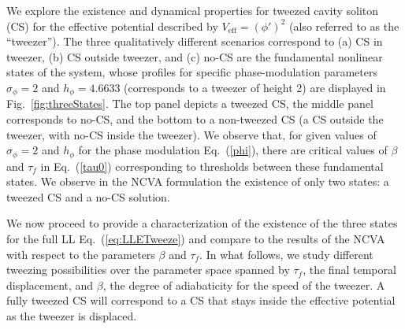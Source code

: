 \documentclass[aps,floatfix,showpacs,preprintnumbers,twocolumn,nofootinbib]{revtex4}
\begin{document}
We explore the existence and dynamical properties for tweezed cavity soliton (CS) for the effective potential described by $V_{\mathrm{eff}} = (\phi')^2$ (also referred to as the ``tweezer'').   The three qualitatively different scenarios correspond to (a) CS in tweezer, (b) CS outside tweezer, and (c) no-CS are the fundamental nonlinear states of the system, whose profiles for specific phase-modulation parameters $\sigma_\phi = 2$ and $h_\phi=4.6633$ (corresponds to a tweezer of height 2) are displayed in Fig.~\ref{fig:threeStates}.  The top panel depicts a tweezed CS, the middle panel corresponds to no-CS, and the bottom to a non-tweezed CS (a CS outside the tweezer, with no-CS inside the tweezer).  We observe that, for given values of $\sigma_\phi = 2$ and $h_\phi$ for the phase modulation Eq.~(\ref{phi}), there are critical values of $\beta$ and $\tau_f$ in Eq.~(\ref{tau0}) corresponding to thresholds between these fundamental states.  We observe in the NCVA formulation the existence of only two states: a tweezed CS and a no-CS solution.  

We now proceed to provide a characterization of the existence of the three states for the full LL Eq.~(\ref{eq:LLETweeze}) and compare to the results of the NCVA with respect to the parameters $\beta$ and $\tau_f$.  In what follows, we study different tweezing possibilities over the parameter space spanned by $\tau_f$, the final temporal displacement, and $\beta$, the degree of adiabaticity for the speed of the tweezer.  A fully tweezed CS will correspond to a CS that stays inside the effective potential as the tweezer is displaced.  
\end{document}
